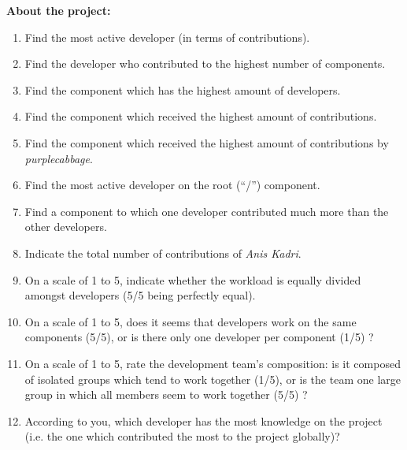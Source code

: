 \textbf{About the project:}
\begin{enumerate}
\itemsep-0.2em
\item Find the most active developer (in terms of contributions).
\item Find the developer who contributed to the highest number of components.
\item Find the component which has the highest amount of developers.
\item Find the component which received the highest amount of contributions.
\item Find the component which received the highest amount of contributions by \emph{purplecabbage}.
\item Find the most active developer on the root (“/”) component.
\item Find a component to which one developer contributed much more than the other developers.
\item Indicate the total number of contributions of \emph{Anis Kadri}.
\item On a scale of 1 to 5, indicate whether the workload is equally divided amongst developers (5/5 being perfectly equal).
\item On a scale of 1 to 5, does it seems that developers work on the same components (5/5), or is there only one developer per component (1/5) ?
\item On a scale of 1 to 5, rate the development team’s composition: is it composed of isolated groups which tend to work together (1/5), or is the team one large group in which all members seem to work together (5/5) ?
\item According to you, which developer has the most knowledge on the project (i.e. the one which contributed the most to the project globally)?
\end{enumerate}